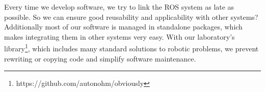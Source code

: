 Every time we develop software, we try to link the ROS system as late as possible. So we can ensure good reusability and applicability with other systems? Additionally most of our software is managed in standalone packages, which makes integrating them in other systems very easy. With our laboratory's library\footnote{https://github.com/autonohm/obviously}, which includes many standard solutions to robotic problems, we prevent rewriting or copying code and simplify software maintenance.
